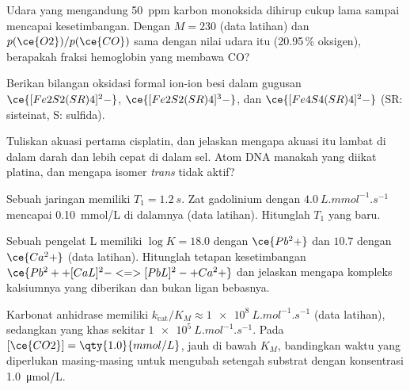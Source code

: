 \begin{exercise}[$\star\star$]\label{exo:b3:bioinorganic:6}
Udara yang mengandung \qty{50}{ppm} karbon monoksida dihirup cukup lama sampai mencapai
kesetimbangan. Dengan $M = 230$ (data latihan) dan $p(\ce{O2})/p(\ce{CO})$ sama dengan nilai udara itu
(20.95\,\% oksigen), berapakah fraksi hemoglobin yang membawa CO?
\end{exercise}

\begin{exercise}[$\star\star$]\label{exo:b3:bioinorganic:7}
Berikan bilangan oksidasi formal ion-ion besi dalam gugusan $\ce{[Fe2S2(SR)4]^2-}$,
$\ce{[Fe2S2(SR)4]^3-}$, dan $\ce{[Fe4S4(SR)4]^2-}$ (SR: sisteinat, S: sulfida).
\end{exercise}

\begin{exercise}[$\star\star$]\label{exo:b3:bioinorganic:8}
Tuliskan akuasi pertama cisplatin, dan jelaskan mengapa akuasi itu lambat di dalam darah dan
lebih cepat di dalam sel. Atom DNA manakah yang diikat platina, dan mengapa isomer
\textit{trans} tidak aktif?
\end{exercise}

\begin{exercise}[$\star\star$]\label{exo:b3:bioinorganic:9}
Sebuah jaringan memiliki $T_1 = \qty{1.2}{s}$. Zat gadolinium dengan  $\qty{4.0}{L.mmol^{-1}.s^{-1}}$ mencapai \qty{0.10}{mmol/L}
di dalamnya (data latihan). Hitunglah $T_1$ yang baru.
\end{exercise}

\begin{exercise}[$\star\star\star$]\label{exo:b3:bioinorganic:10}
Sebuah pengelat L memiliki $\log K = 18.0$ dengan $\ce{Pb^2+}$ dan $10.7$ dengan $\ce{Ca^2+}$ (data latihan).
Hitunglah tetapan kesetimbangan $\ce{Pb^2+ + [CaL]^2- <=> [PbL]^2- + Ca^2+}$ dan jelaskan mengapa kompleks
kalsiumnya yang diberikan dan bukan ligan bebasnya.
\end{exercise}

\begin{exercise}[$\star\star\star$]\label{exo:b3:bioinorganic:11}
Karbonat anhidrase memiliki $k_{\mathrm{cat}}/K_M \approx \qty{1e8}{L.mol^{-1}.s^{-1}}$ (data latihan), sedangkan  yang khas sekitar
$\qty{1e5}{L.mol^{-1}.s^{-1}}$. Pada $[\ce{CO2}] = \qty{1.0}{mmol/L}$, jauh di bawah $K_M$, bandingkan waktu yang diperlukan masing-masing untuk mengubah setengah
substrat dengan konsentrasi  \qty{1.0}{\micro mol/L}.
\end{exercise}

